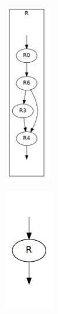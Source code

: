 \documentclass[11pt]{article}
\begin{document}
\begin{figure}[h]
\caption{Редукция CFG, шаг 2}
\label{pic:pic2}
\begin{subfigure}{0.5\textwidth}

\includegraphics[height=300px]{region3.png}

\end{subfigure}
\begin{subfigure}{0.5\textwidth}

\includegraphics[height=200px]{region4.png}

\end{subfigure}
\end{figure}
\end{document}
